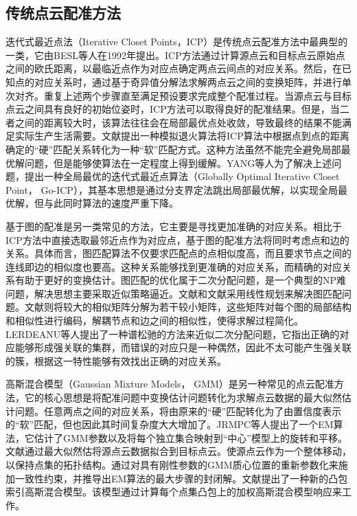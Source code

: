     \subsection{传统点云配准方法}
    迭代式最近点法（Iterative Closet Points，ICP）是传统点云配准方法中最典型的一类，它由BESL等人在1992年提出。ICP方法通过计算源点云和目标点云原始点之间的欧氏距离，以最临近点作为对应点确定两点云间点的对应关系。然后，在已知点的对应关系时，通过基于奇异值分解法求解两点云之间的变换矩阵，并进行单次对齐。重复上述两个步骤直至满足预设要求完成整个配准过程。当源点云与目标点云之间具有良好的初始位姿时，ICP方法可以取得良好的配准结果。但是，当二者之间的距离较大时，该算法往往会在局部最优点处收敛，导致最终的结果不能满足实际生产生活需要。文献\cite{1998}提出一种模拟退火算法将ICP算法中根据点到点的距离确定的“硬”匹配关系转化为一种“软”匹配方式。这种方法虽然不能完全避免局部最优解问题，但是能够使算法在一定程度上得到缓解。YANG等人为了解决上述问题，提出一种全局最优的迭代式最近点算法（Globally Optimal Iterative Closet Point， Go-ICP），其基本思想是通过分支界定法跳出局部最优解，以实现全局最优解，但与此同时算法的速度严重下降。

    基于图的配准是另一类常见的方法，它主要是寻找更加准确的对应关系。相比于ICP方法中直接选取最邻近点作为对应点，基于图的配准方法将同时考虑点和边的关系。具体而言，图匹配算法不仅要求匹配点的点相似度高，而且要求节点之间的连线即边的相似度也要高。这种关系能够找到更准确的对应关系，而精确的对应关系有助于更好的变换估计。图匹配的优化属于二次分配问题，是一个典型的NP难问题，解决思想主要采取近似策略逼近。文献\cite{Almohamad}和文献\cite{CSGM}采用线性规划来解决图匹配问题。文献\cite{FGM}则将较大的相似矩阵分解为若干较小矩阵，这些矩阵对每个图的局部结构和相似性进行编码，解耦节点和边之间的相似性，使得求解过程简化。LERDEANU等人提出了一种谱松驰的方法来近似二次分配问题，它指出正确的对应能够形成强关联的集群，而错误的对应只是一种偶然，因此不太可能产生强关联的簇，根据这一特性能够有效找出正确的对应关系。

    高斯混合模型（Gaussian Mixture Models， GMM）是另一种常见的点云配准方法，它的核心思想是将配准问题中变换估计问题转化为求解点云数据的最大似然估计问题。任意两点之间的对应关系，将由原来的“硬”匹配转化为了由置信度表示的“软”匹配，但也因此其时间复杂度大大增加了。JRMPC等人提出了一个EM算法，它估计了GMM参数以及将每个独立集合映射到“中心”模型上的旋转和平移。文献\cite{CPD}通过最大似然估将源点云数据拟合到目标点云。使源点云作为一个整体移动，以保持点集的拓扑结构。通过对具有刚性参数的GMM质心位置的重新参数化来施加一致性约束，并推导出EM算法的最大步骤的封闭解。文献\cite{CH-GMM}提出了一种新的凸包索引高斯混合模型。该模型通过计算每个点集凸包上的加权高斯混合模型响应来工作。

